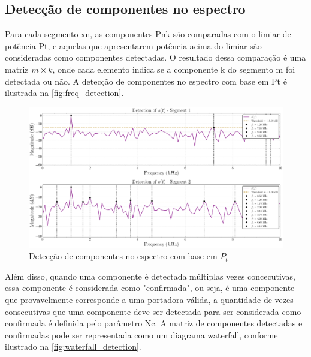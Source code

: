 \subsection{Detecção de componentes no espectro}\label{sec:comparacao_potencia}

Para cada segmento \gls{xn}, as componentes \gls{Pnk} são comparadas com o limiar de potência \gls{Pt}, e aquelas que apresentarem potência acima do limiar são consideradas como componentes detectadas. O resultado dessa comparação é uma matriz $m \times k$, onde cada elemento indica se a componente \gls{k} do segmento \gls{m} foi detectada ou não. A detecção de componentes no espectro com base em \gls{Pt} é ilustrada na \autoref{fig:freq_detection}.

\begin{figure}[H]
	\centering
	\caption{Detecção de componentes no espectro com base em $P_t$}\label{fig:freq_detection}
	\includegraphics[width=\linewidth]{assets/cap3/example_detector_freq.pdf}
\end{figure}

Além disso, quando uma componente é detectada múltiplas vezes concecutivas, essa componente é considerada como "confirmada", ou seja, é uma componente que provavelmente corresponde a uma portadora válida, a quantidade de vezes consecutivas que uma componente deve ser detectada para ser considerada como confirmada é definida pelo parâmetro \gls{Nc}. A matriz de componentes detectadas e confirmadas pode ser representada como um diagrama waterfall, conforme ilustrado na \autoref{fig:waterfall_detection}.


